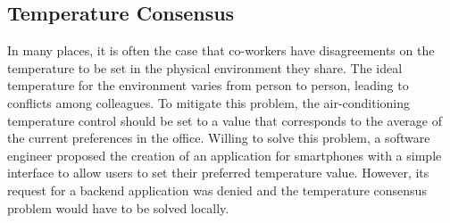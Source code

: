 
%
%
%
%





%
%
%
%
%
%

\subsection{Temperature Consensus}

In many places, it is often the case that co-workers have disagreements on the temperature to be set in the physical environment they share. The ideal temperature for the environment varies from person to person, leading to conflicts among colleagues. To mitigate this problem, the air-conditioning temperature control should be set to a value that corresponds to the average of the current preferences in the office. Willing to solve this problem, a software engineer proposed the creation of an application for smartphones with a simple interface to allow users to set their preferred temperature value. However, its request for a backend application was denied and the temperature consensus problem would have to be solved locally.

